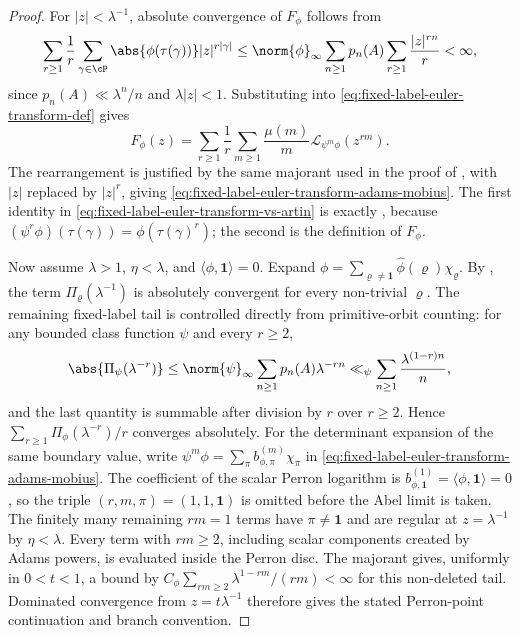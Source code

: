 \begin{proof}
  For \(|z|<\lambda^{-1}\), absolute convergence of \(F_\phi\) follows
  from
  \[
    \sum_{r\ge1}\frac{1}{r}
      \sum_{\gamma\in\cP}\abs{\phi(\tau(\gamma))}|z|^{r|\gamma|}
    \le
    \norm{\phi}_\infty
    \sum_{n\ge1}p_n(A)\sum_{r\ge1}\frac{|z|^{rn}}{r}
    <\infty,
  \]
  since \(p_n(A)\ll\lambda^n/n\) and \(\lambda|z|<1\). Substituting
   into
  \eqref{eq:fixed-label-euler-transform-def} gives
  \[
    F_\phi(z)
    =
    \sum_{r\ge1}\frac{1}{r}
      \sum_{m\ge1}\frac{\mu(m)}{m}
        \mathcal L_{\psi^m\phi}(z^{rm}).
  \]
  The rearrangement is justified by the same majorant used in the proof
  of , with \(|z|\) replaced by
  \(|z|^r\), giving \eqref{eq:fixed-label-euler-transform-adams-mobius}.
  The first identity in
  \eqref{eq:fixed-label-euler-transform-vs-artin} is exactly
  , because
  \((\psi^r\phi)(\tau(\gamma))=\phi(\tau(\gamma)^r)\); the second is the
  definition of \(F_\phi\).

  Now assume \(\lambda>1\), \(\eta<\lambda\), and
  \(\langle\phi,\mathbf1\rangle=0\). Expand
  \(\phi=\sum_{\varrho\neq\mathbf1}\widehat\phi(\varrho)\chi_\varrho\).
  By , the term
  \(\Pi_\varrho(\lambda^{-1})\) is absolutely convergent for every
  non-trivial \(\varrho\).  The remaining fixed-label tail is controlled
  directly from primitive-orbit counting: for any bounded class function
  \(\psi\) and every \(r\ge2\),
  \[
    \abs{\Pi_\psi(\lambda^{-r})}
    \le
    \norm{\psi}_\infty\sum_{n\ge1}p_n(A)\lambda^{-rn}
    \ll_\psi
    \sum_{n\ge1}\frac{\lambda^{(1-r)n}}{n},
  \]
  and the last quantity is summable after division by \(r\) over
  \(r\ge2\). Hence \(\sum_{r\ge1}\Pi_\phi(\lambda^{-r})/r\) converges
  absolutely. For the determinant expansion of the same boundary value, write
  \(\psi^m\phi=\sum_\pi b_{\phi,
  \pi}^{(m)}\chi_\pi\) in
  \eqref{eq:fixed-label-euler-transform-adams-mobius}.  The coefficient of
  the scalar Perron logarithm is
  \(b_{\phi,\mathbf1}^{(1)}=\langle\phi,\mathbf1\rangle=0\), so the triple
  \((r,m,\pi)=(1,1,\mathbf1)\) is omitted before the Abel limit is taken.  The
  finitely many remaining \(rm=1\) terms have \(\pi\ne\mathbf1\) and are
  regular at \(z=\lambda^{-1}\) by \(\eta<\lambda\).  Every term with
  \(rm\ge2\), including scalar components created by Adams powers, is evaluated
  inside the Perron disc.  The majorant
   gives, uniformly in
  \(0<t<1\), a bound by
  \(C_\phi\sum_{rm\ge2}\lambda^{1-rm}/(rm)<\infty\) for this non-deleted tail.
  Dominated convergence from \(z=t\lambda^{-1}\) therefore gives the stated
  Perron-point continuation and branch convention.
\end{proof}

